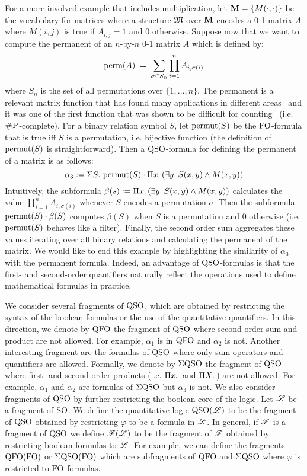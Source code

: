 \begin{example}\label{exa-perm}
For a more involved example that includes multiplication, let $\mathbf{M} = \{M(\cdot,\cdot)\}$ be the vocabulary for matrices where a structure $\mathfrak{M}$ over $\mathbf{M}$ encodes a 0-1 matrix $A$ where $M(i,j)$ is true if $A_{i,j} = 1$ and $0$ otherwise. 
Suppose now that we want to compute the permanent of an $n$-by-$n$ 0-1 matrix $A$ which is defined by:
$$
\operatorname{perm}(A) \; = \; \sum_{\sigma \in S_n} \prod_{i=1}^n A_{i, \sigma(i)}  
$$
where $S_n$ is the set of all permutations over $\{1, \ldots, n\}$.
The permanent is a relevant matrix function that has found many applications in different areas~\cite{permanent-applications} and it was one of the first function that was shown to be difficult for counting~\cite{Valiant79} (i.e. $\text{\sc \#P}$-complete). 
For a binary relation symbol $S$, let $\operatorname{permut}(S)$ be the ${\rm FO}$-formula that is true iff $S$ is a permutation, i.e. bijective function (the definition of $\operatorname{permut}(S)$ is straightforward).
Then a ${\rm QSO}$-formula for defining the permanent of a matrix is as follows:
\[
\alpha_3 := \Sigma{S}.\, \operatorname{permut}(S) \cdot \Pi{x}.\, (\exists{y}.\: S(x,y) \wedge M(x,y))
\]
Intuitively, the subformula $\beta(s) := \Pi{x}.\, (\exists{y}.\: S(x,y) \wedge M(x,y))$ calculates the value $\prod_{i=1}^n A_{i, \sigma(i)}$ whenever $S$ encodes a permutation $\sigma$.
Then the subformula $\operatorname{permut}(S) \cdot \beta(S)$ computes $\beta(S)$ when $S$ is a permutation and $0$ otherwise (i.e. $\operatorname{permut}(S)$ behaves like a filter). 
Finally, the second order sum aggregates these values iterating over all binary relations and calculating the permanent of the matrix.
We would like to end this example by highlighting the similarity of $\alpha_3$ with the permanent formula. 
Indeed, an advantage of ${\rm QSO}$-formulas is that the first- and second-order quantifiers naturally reflect the operations used to define mathematical formulas in practice.
\end{example}

We consider several fragments of ${\rm QSO}$, which are obtained by restricting the syntax of the boolean formulas or the use of the quantitative quantifiers.
In this direction, we denote by ${\rm QFO}$ the fragment of ${\rm QSO}$ where second-order sum and product are not allowed. 
For example, $\alpha_1$ is in ${\rm QFO}$ and $\alpha_2$ is not.
Another interesting fragment are the formulas of ${\rm QSO}$ where only sum operators and quantifiers are allowed. 
Formally, we denote by $\Sigma{\rm QSO}$ the fragment of ${\rm QSO}$ where first- and second-order products (i.e. $\Pi{x}.\,$ and $\Pi{X}.\,$) are not allowed.
For example, $\alpha_1$ and $\alpha_2$ are formulas of $\Sigma{\rm QSO}$ but $\alpha_3$ is not. 
We also consider fragments of ${\rm QSO}$ by further restricting the boolean core of the logic.
Let $\mathscr{L}$ be a fragment of ${\rm SO}$.
We define the quantitative logic ${\rm QSO}(\mathscr{L})$ to be the fragment of ${\rm QSO}$ obtained by restricting $\varphi$ to be a formula in $\mathscr{L}$. 
In general, if $\mathscr{F}$ is a fragment of ${\rm QSO}$ we define $\mathscr{F}(\mathscr{L})$ to be the fragment of $\mathscr{F}$ obtained by restricting boolean formulas to $\mathscr{L}$.
For example, we can define the fragments ${\rm QFO}({\rm FO})$ or $\Sigma{\rm QSO}({\rm FO})$ which are subfragments of ${\rm QFO}$ and $\Sigma{\rm QSO}$ where $\varphi$ is restricted to ${\rm FO}$ formulas. 


